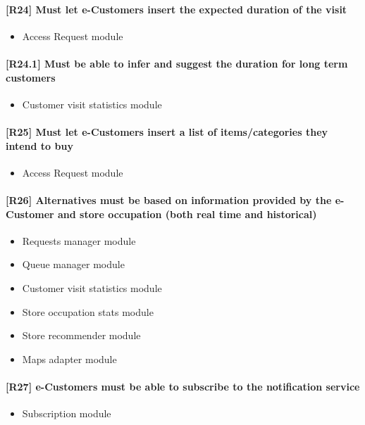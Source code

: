 \paragraph{[R24] Must let e-Customers insert the expected duration of the visit}
\begin{itemize}[itemsep=-1mm, topsep=-1mm]
	\item Access Request module
\end{itemize}

\paragraph{[R24.1] Must be able to infer and suggest the duration for long term customers}
\begin{itemize}[itemsep=-1mm, topsep=-1mm]
	\item Customer visit statistics module
\end{itemize}

\paragraph{[R25] Must let e-Customers insert a list of items/categories they intend to buy}
\begin{itemize}[itemsep=-1mm, topsep=-1mm]
	\item Access Request module
\end{itemize}

\paragraph{[R26] Alternatives must be based on information provided by the e-Customer and store occupation (both real time and historical)}
\begin{itemize}[itemsep=-1mm, topsep=-1mm]
	\item Requests manager module
	\item Queue manager module
	\item Customer visit statistics module
	\item Store occupation stats module
	\item Store recommender module
	\item Maps adapter module
\end{itemize}

\paragraph{[R27] e-Customers must be able to subscribe to the notification service}
\begin{itemize}[itemsep=-1mm, topsep=-1mm]
	\item Subscription module
\end{itemize}

